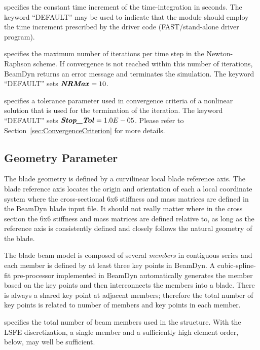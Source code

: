  specifies the constant time increment of the time-integration in seconds. 
The keyword ``DEFAULT'' may be used to indicate that the module should employ the time increment prescribed by the driver code (FAST/stand-alone driver program).

 specifies the maximum number of iterations per time step in the Newton-Raphson scheme. 
If convergence is not reached within this number of iterations, BeamDyn returns an error message and terminates the simulation. 
The keyword ``DEFAULT'' sets $\textbf{\textit{NRMax}} = 10$.

 specifies a tolerance parameter used in convergence criteria of a nonlinear solution that is used for the termination of the iteration. 
The keyword ``DEFAULT'' sets $\textbf{\textit{Stop\_Tol}} = 1.0E-05$. Please refer to Section~\ref{sec:ConvergenceCriterion} for more details.


\subsection{Geometry Parameter}

The blade geometry is defined by a curvilinear local blade reference axis. The blade reference axis locates the origin and orientation of each a local coordinate system where the cross-sectional 6x6 stiffness and mass matrices are defined in the BeamDyn blade input file.  It should not really matter where in the cross section the 6x6 stiffness and mass matrices are defined relative to, as long as the reference axis is consistently defined and closely follows the natural geometry of the blade. 

The blade beam model is composed of several {\it members} in contiguous series and each member is defined by at least three key points in BeamDyn. 
A cubic-spline-fit pre-processor implemented in BeamDyn automatically generates the member based on the key points and then interconnects the members into a blade. 
There is always a shared key point at adjacent members; therefore the total number of key points is related to number of members and key points in each member.

 specifies the total number of beam members used in the structure. 
With the LSFE discretization, a single member and a sufficiently high element order,  below, may well be sufficient.

